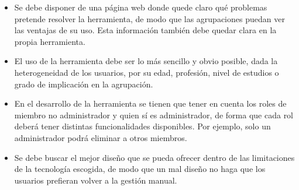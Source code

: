 \begin{itemize}
    \item Se debe disponer de una página web donde quede claro qué problemas pretende resolver la herramienta, de modo que las agrupaciones puedan ver las ventajas de su uso. Esta información también debe quedar clara en la propia herramienta.
    \item El uso de la herramienta debe ser lo más sencillo y obvio posible, dada la heterogeneidad de los usuarios, por su edad, profesión, nivel de estudios o grado de implicación en la agrupación.
    \item En el desarrollo de la herramienta se tienen que tener en cuenta los roles de miembro no administrador y quien sí es administrador, de forma que cada rol deberá tener distintas funcionalidades disponibles. Por ejemplo, solo un administrador podrá eliminar a otros miembros.
    \item Se debe buscar el mejor diseño que se pueda ofrecer dentro de las limitaciones de la tecnología escogida, de modo que un mal diseño no haga que los usuarios prefieran volver a la gestión manual.
\end{itemize}

